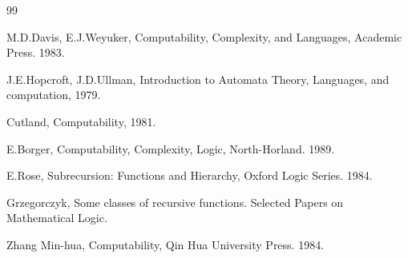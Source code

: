 \begin{thebibliography}{99}

\bibitem{[1]} 
M.D.Davis, E.J.Weyuker, Computability, Complexity, and 
Languages, Academic Press. 1983.

\bibitem{[2]} J.E.Hopcroft, J.D.Ullman, 
Introduction to Automata Theory, 
Languages, and computation, 1979.

\bibitem{[3]}Cutland, Computability, 1981.

\bibitem{[4]}  E.Borger, 
Computability, Complexity, Logic, North-Horland. 
1989.


\bibitem{[5]} E.Rose, Subrecursion: 
Functions and Hierarchy, Oxford Logic 
Series. 1984.

\bibitem{[6]} Grzegorczyk, Some classes of 
recursive functions. Selected 
Papers on Mathematical Logic.

\bibitem{[7]} Zhang Min-hua, 
Computability, Qin Hua University
Press. 1984.
\end{thebibliography}



\bibitem{[1]} 




